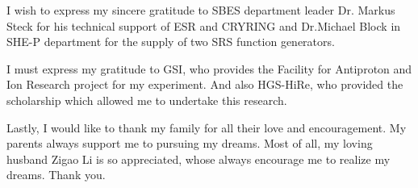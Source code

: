 I wish to express my sincere gratitude to SBES department leader Dr. Markus Steck for his technical support of ESR and CRYRING and Dr.Michael Block in SHE-P department for the supply of two SRS function generators. 

I must express my gratitude to GSI, who provides the Facility for Antiproton and Ion Research project for my experiment. And also HGS-HiRe, who provided the scholarship which allowed me to undertake this research.


Lastly, I would like to thank my family for all their love and encouragement. My parents always support me to pursuing my dreams. Most of all, my loving husband Zigao Li is so appreciated, whose always encourage me to realize my dreams. Thank you.




